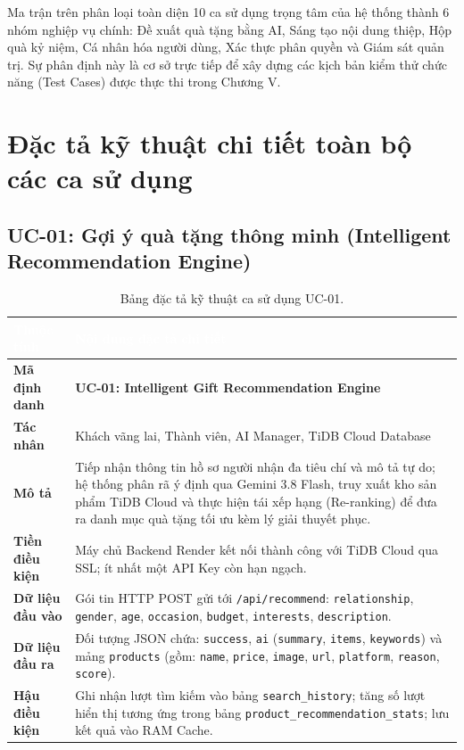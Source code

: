 Ma trận trên phân loại toàn diện 10 ca sử dụng trọng tâm của hệ thống thành 6 nhóm nghiệp vụ chính: Đề xuất quà tặng bằng AI, Sáng tạo nội dung thiệp, Hộp quà kỷ niệm, Cá nhân hóa người dùng, Xác thực phân quyền và Giám sát quản trị. Sự phân định này là cơ sở trực tiếp để xây dựng các kịch bản kiểm thử chức năng (Test Cases) được thực thi trong Chương V.

\section{Đặc tả kỹ thuật chi tiết toàn bộ các ca sử dụng}

\subsection{UC-01: Gợi ý quà tặng thông minh (Intelligent Recommendation Engine)}

\begin{table}[htbp]
\centering
\caption{Bảng đặc tả kỹ thuật ca sử dụng UC-01.}
\label{tab:spec_uc01}
\small
\renewcommand{\arraystretch}{1.2}
\begin{tabularx}{\textwidth}{|p{3.2cm}|X|}
\hline
\rowcolor{PrimaryBlue}
\textcolor{white}{\textbf{Thuộc tính}} & \textcolor{white}{\textbf{Nội dung đặc tả chi tiết}} \\
\hline
\textbf{Mã định danh} & \textbf{UC-01: Intelligent Gift Recommendation Engine} \\
\hline
\textbf{Tác nhân} & Khách vãng lai, Thành viên, AI Manager, TiDB Cloud Database \\
\hline
\textbf{Mô tả} & Tiếp nhận thông tin hồ sơ người nhận đa tiêu chí và mô tả tự do; hệ thống phân rã ý định qua Gemini 3.8 Flash, truy xuất kho sản phẩm TiDB Cloud và thực hiện tái xếp hạng (Re-ranking) để đưa ra danh mục quà tặng tối ưu kèm lý giải thuyết phục. \\
\hline
\textbf{Tiền điều kiện} & Máy chủ Backend Render kết nối thành công với TiDB Cloud qua SSL; ít nhất một API Key còn hạn ngạch. \\
\hline
\textbf{Dữ liệu đầu vào} & Gói tin HTTP POST gửi tới \texttt{/api/recommend}: \texttt{relationship}, \texttt{gender}, \texttt{age}, \texttt{occasion}, \texttt{budget}, \texttt{interests}, \texttt{description}. \\
\hline
\textbf{Dữ liệu đầu ra} & Đối tượng JSON chứa: \texttt{success}, \texttt{ai} (\texttt{summary}, \texttt{items}, \texttt{keywords}) và mảng \texttt{products} (gồm: \texttt{name}, \texttt{price}, \texttt{image}, \texttt{url}, \texttt{platform}, \texttt{reason}, \texttt{score}). \\
\hline
\textbf{Hậu điều kiện} & Ghi nhận lượt tìm kiếm vào bảng \texttt{search\_history}; tăng số lượt hiển thị tương ứng trong bảng \texttt{product\_recommendation\_stats}; lưu kết quả vào RAM Cache. \\
\hline
\end{tabularx}
\end{table}


